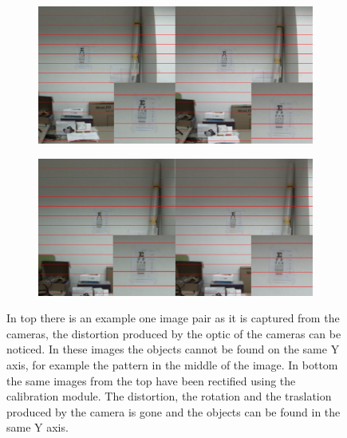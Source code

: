 \documentclass[10pt,a4paper,twocolumn,twoside]{article}
\begin{document}
	\begin{figure}
		\centering
		\begin{subfigure}[t]{0.5\textwidth}
			\centering
			\includegraphics[width=\linewidth]{img/regular2z.png}
			\label{fig:rec:regular}
		\end{subfigure}%
	\vspace{1cm}
		\begin{subfigure}[t]{0.5\textwidth}
			\centering
			\includegraphics[width=\linewidth]{img/rectified2z.png}
			\label{fig:rec:ractified}
		\end{subfigure}
		\caption{In top there is an example one image pair as it is captured from the cameras, the distortion produced by the optic of the cameras can be noticed. In these images the objects cannot be found on the same Y axis, for example the pattern in the middle of the image. In bottom the same images from the top have been rectified using the calibration module. The distortion, the rotation and the traslation produced by the camera is gone and the objects can be found in the same Y axis. }
		\label{fig:rec}
	\end{figure}
	
\end{document}
